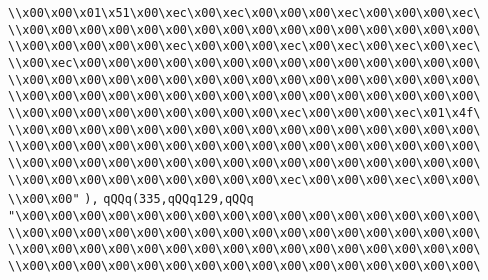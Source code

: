 \verb|\\x00\x00\x01\x51\x00\xec\x00\xec\x00\x00\x00\xec\x00\x00\x00\xec\|\newline
\verb|\\x00\x00\x00\x00\x00\x00\x00\x00\x00\x00\x00\x00\x00\x00\x00\x00\|\newline
\verb|\\x00\x00\x00\x00\x00\xec\x00\x00\x00\xec\x00\xec\x00\xec\x00\xec\|\newline
\verb|\\x00\xec\x00\x00\x00\x00\x00\x00\x00\x00\x00\x00\x00\x00\x00\x00\|\newline
\verb|\\x00\x00\x00\x00\x00\x00\x00\x00\x00\x00\x00\x00\x00\x00\x00\x00\|\newline
\verb|\\x00\x00\x00\x00\x00\x00\x00\x00\x00\x00\x00\x00\x00\x00\x00\x00\|\newline
\verb|\\x00\x00\x00\x00\x00\x00\x00\x00\x00\xec\x00\x00\x00\xec\x01\x4f\|\newline
\verb|\\x00\x00\x00\x00\x00\x00\x00\x00\x00\x00\x00\x00\x00\x00\x00\x00\|\newline
\verb|\\x00\x00\x00\x00\x00\x00\x00\x00\x00\x00\x00\x00\x00\x00\x00\x00\|\newline
\verb|\\x00\x00\x00\x00\x00\x00\x00\x00\x00\x00\x00\x00\x00\x00\x00\x00\|\newline
\verb|\\x00\x00\x00\x00\x00\x00\x00\x00\x00\xec\x00\x00\x00\xec\x00\x00\|\newline
\verb|\\x00\x00"|\newline
\verb|),|\newline
\verb|qQQq(335,qQQq129,qQQq|\newline
\verb|"\x00\x00\x00\x00\x00\x00\x00\x00\x00\x00\x00\x00\x00\x00\x00\x00\|\newline
\verb|\\x00\x00\x00\x00\x00\x00\x00\x00\x00\x00\x00\x00\x00\x00\x00\x00\|\newline
\verb|\\x00\x00\x00\x00\x00\x00\x00\x00\x00\x00\x00\x00\x00\x00\x00\x00\|\newline
\verb|\\x00\x00\x00\x00\x00\x00\x00\x00\x00\x00\x00\x00\x00\x00\x00\x00\|\newline
